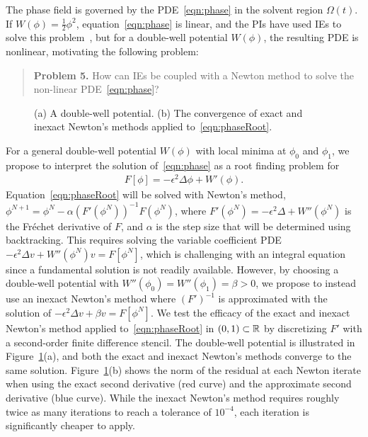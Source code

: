 The phase field is governed by the PDE~\eqref{eqn:phase} in the solvent
region $\Omega(t)$. If $W(\phi) = \tfrac{1}{2}\phi^2$,
equation~\eqref{eqn:phase} is linear, and the PIs have used IEs to solve
this problem~\cite{Fu2018_SIAM, FuQuRyYo22, fu-ryh-qua-you2022}, but for
a double-well potential $W(\phi)$, the resulting PDE is nonlinear,
motivating the following problem:

\begin{quotation}
  \noindent
  \textbf{Problem 5.} How can IEs be coupled with a Newton method to
  solve the non-linear PDE~\eqref{eqn:phase}?
\end{quotation}
\begin{figure}
  \vspace{-7pt}
  \centering
   
  \vspace{-10pt}
  \caption{\label{fig:CA} \footnotesize (a) A double-well potential. (b)
  The convergence of exact and inexact Newton's methods applied
  to~\eqref{eqn:phaseRoot}.}
\end{figure}
For a general double-well potential $W(\phi)$ with local minima at
$\phi_0$ and $\phi_1$, we propose to interpret the solution
of~\eqref{eqn:phase} as a root finding problem for
\begin{align}
  \label{eqn:phaseRoot}
  F[\phi] = -\epsilon^2 \Delta \phi + W'(\phi).
\end{align}
Equation~\eqref{eqn:phaseRoot} will be solved with Newton's method,
$\phi^{N+1} = \phi^{N} - \alpha (F'(\phi^N))^{-1} F(\phi^N)$, where
$F'(\phi^N) = -\epsilon^2 \Delta + W''(\phi^N)$ is the Fr\'{e}chet
derivative of $F$, and $\alpha$ is the step size that will be determined
using backtracking. This requires solving the variable coefficient PDE
$-\epsilon^2 \Delta v + W''(\phi^{N}) v = F[\phi^N]$, which is
challenging with an integral equation since a fundamental solution is
not readily available. However, by choosing a double-well potential with
$W''(\phi_0) = W''(\phi_1) = \beta > 0$, we propose to instead use an
inexact Newton's method where $(F')^{-1}$ is approximated with the
solution of $-\epsilon^2 \Delta v + \beta v = F[\phi^N]$. We test the
efficacy of the exact and inexact Newton's method applied
to~\eqref{eqn:phaseRoot} in $(0,1) \subset \mathbb{R}$ by discretizing $F'$
with a second-order finite difference stencil. The double-well potential
is illustrated in Figure~\ref{fig:CA}(a), and both the exact and inexact
Newton's methods converge to the same solution. Figure~\ref{fig:CA}(b)
shows the norm of the residual at each Newton
iterate when using the exact second derivative (red curve) and the
approximate second derivative (blue curve). While the inexact Newton's
method requires roughly twice as many iterations to reach a tolerance
of $10^{-4}$, each iteration is significantly cheaper to apply.

